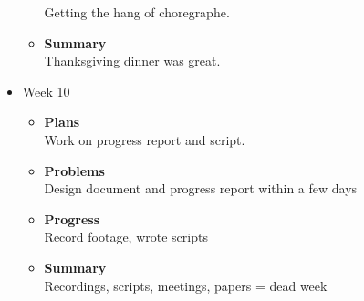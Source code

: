 \begin{itemize}
\begin{itemize}
				Getting the hang of choregraphe.
				\item \textbf{Summary} \\
				Thanksgiving dinner was great.
			\end{itemize}
		\item{Week 10}
			\begin{itemize}
				\item \textbf{Plans} \\
				Work on progress report and script.
				\item \textbf{Problems} \\
				Design document and progress report within a few days
				\item \textbf{Progress} \\
				Record footage, wrote scripts
				\item \textbf{Summary} \\
				Recordings, scripts, meetings, papers = dead week
			\end{itemize}
	\end{itemize}

